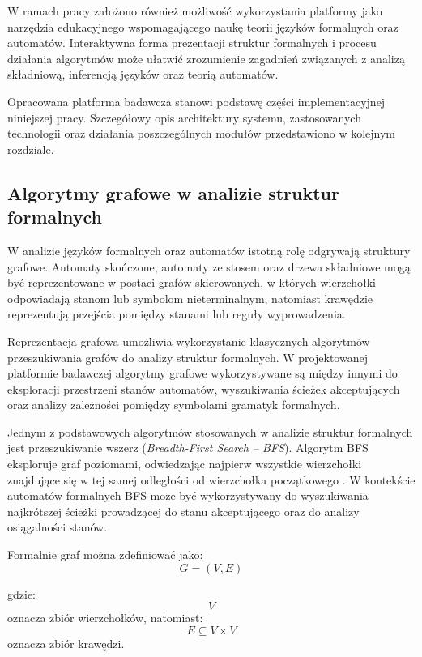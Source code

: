 \documentclass[12pt]{article}
\begin{document}
W ramach pracy założono również możliwość wykorzystania platformy jako narzędzia edukacyjnego wspomagającego naukę teorii języków formalnych oraz automatów. Interaktywna forma prezentacji struktur formalnych i procesu działania algorytmów może ułatwić zrozumienie zagadnień związanych z analizą składniową, inferencją języków oraz teorią automatów.

Opracowana platforma badawcza stanowi podstawę części implementacyjnej niniejszej pracy. Szczegółowy opis architektury systemu, zastosowanych technologii oraz działania poszczególnych modułów przedstawiono w kolejnym rozdziale.


\subsection{Algorytmy grafowe w analizie struktur formalnych}

W analizie języków formalnych oraz automatów istotną rolę odgrywają struktury grafowe. Automaty skończone, automaty ze stosem oraz drzewa składniowe mogą być reprezentowane w postaci grafów skierowanych, w których wierzchołki odpowiadają stanom lub symbolom nieterminalnym, natomiast krawędzie reprezentują przejścia pomiędzy stanami lub reguły wyprowadzenia.

Reprezentacja grafowa umożliwia wykorzystanie klasycznych algorytmów przeszukiwania grafów do analizy struktur formalnych. W projektowanej platformie badawczej algorytmy grafowe wykorzystywane są między innymi do eksploracji przestrzeni stanów automatów, wyszukiwania ścieżek akceptujących oraz analizy zależności pomiędzy symbolami gramatyk formalnych.

Jednym z podstawowych algorytmów stosowanych w analizie struktur formalnych jest przeszukiwanie wszerz (\textit{Breadth-First Search -- BFS}). Algorytm BFS eksploruje graf poziomami, odwiedzając najpierw wszystkie wierzchołki znajdujące się w tej samej odległości od wierzchołka początkowego \cite{cormen2022}. W kontekście automatów formalnych BFS może być wykorzystywany do wyszukiwania najkrótszej ścieżki prowadzącej do stanu akceptującego oraz do analizy osiągalności stanów.

Formalnie graf można zdefiniować jako:
\begin{equation}
G = (V, E)
\end{equation}

gdzie:
\begin{equation}
V
\end{equation}
oznacza zbiór wierzchołków, natomiast:
\begin{equation}
E \subseteq V \times V
\end{equation}
oznacza zbiór krawędzi.
\end{document}
